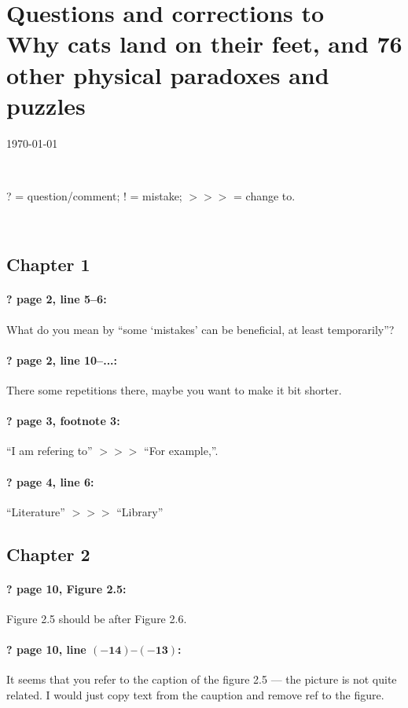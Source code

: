 \documentclass[twoside]{article}
\begin{document}
\pagestyle{empty}

\section*{Questions and corrections to\\
Why cats land on their feet, and 76 other physical paradoxes
and puzzles}

\today

\

? = question/comment;\qquad
! = mistake;\qquad
$>\!>\!>$ = change to.

\

\subsection*{Chapter 1}

\paragraph{? page 2, line 5--6:} What do you mean by ``some ‘mistakes’ can be beneficial, at least temporarily''?

\paragraph{? page 2, line 10--...:} There some repetitions there, maybe you want to make it bit shorter.

\paragraph{? page 3, footnote 3:} ``I am refering to'' $>\!>\!>$ ``For example,''.

\paragraph{? page 4, line 6:} ``Literature'' $>\!>\!>$ ``Library''

\subsection*{Chapter 2}

\paragraph{? page 10, Figure 2.5:} Figure  2.5 should be after Figure 2.6.

\paragraph{? page 10, line $\bm{(-14)}$--$\bm{(-13)}$:} It seems that you refer to the caption of the figure 2.5 --- the picture is not quite related. I would just copy text from the cauption and remove ref to the figure.
\end{document}
